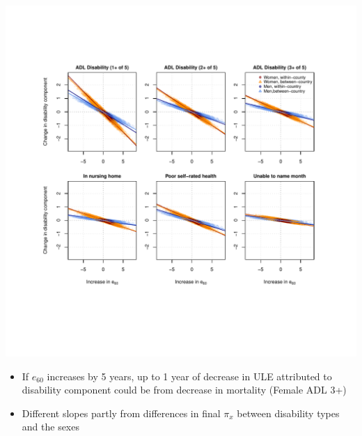 \documentclass[20pt]{beamer}
\begin{document}
\begin{frame}[plain]
\begin{center}
\includegraphics[trim=1cm 0 0 2.5cm, clip, scale=1.3]{Figures/Decomp_2x3.pdf}
\end{center}
\end{frame}
\begin{frame}[plain]
\Large
\begin{itemize}[<+->]
\item If $e_{60}$ increases by 5 years, up to 1 year of decrease in ULE attributed to disability component could be from decrease in mortality (Female ADL 3+)
\item Different slopes partly from differences in final $\pi_x$ between
disability types and the sexes
\end{itemize}
\end{frame}

\end{document}
